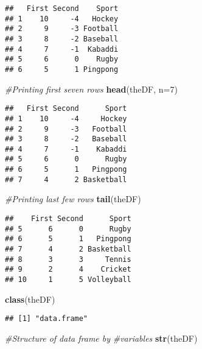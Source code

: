 \documentclass[
]{article}
\newenvironment{Shaded}{\begin{snugshade}}{\end{snugshade}}
\newcommand{\AttributeTok}[1]{\textcolor[rgb]{0.13,0.29,0.53}{#1}}
\newcommand{\CommentTok}[1]{\textcolor[rgb]{0.56,0.35,0.01}{\textit{#1}}}
\newcommand{\DecValTok}[1]{\textcolor[rgb]{0.00,0.00,0.81}{#1}}
\newcommand{\FunctionTok}[1]{\textcolor[rgb]{0.13,0.29,0.53}{\textbf{#1}}}
\newcommand{\NormalTok}[1]{#1}
\begin{document}
\begin{verbatim}
##   First Second    Sport
## 1    10     -4   Hockey
## 2     9     -3 Football
## 3     8     -2 Baseball
## 4     7     -1  Kabaddi
## 5     6      0    Rugby
## 6     5      1 Pingpong
\end{verbatim}

\begin{Shaded}
\begin{Highlighting}[]
\CommentTok{\#Printing first seven rows}
\FunctionTok{head}\NormalTok{(theDF, }\AttributeTok{n=}\DecValTok{7}\NormalTok{)}
\end{Highlighting}
\end{Shaded}

\begin{verbatim}
##   First Second      Sport
## 1    10     -4     Hockey
## 2     9     -3   Football
## 3     8     -2   Baseball
## 4     7     -1    Kabaddi
## 5     6      0      Rugby
## 6     5      1   Pingpong
## 7     4      2 Basketball
\end{verbatim}

\begin{Shaded}
\begin{Highlighting}[]
\CommentTok{\#Printing last few rows}
\FunctionTok{tail}\NormalTok{(theDF)}
\end{Highlighting}
\end{Shaded}

\begin{verbatim}
##    First Second      Sport
## 5      6      0      Rugby
## 6      5      1   Pingpong
## 7      4      2 Basketball
## 8      3      3     Tennis
## 9      2      4    Cricket
## 10     1      5 Volleyball
\end{verbatim}

\begin{Shaded}
\begin{Highlighting}[]
\FunctionTok{class}\NormalTok{(theDF)}
\end{Highlighting}
\end{Shaded}

\begin{verbatim}
## [1] "data.frame"
\end{verbatim}

\begin{Shaded}
\begin{Highlighting}[]
\CommentTok{\#Structure of data frame by}
\CommentTok{\#variables}
\FunctionTok{str}\NormalTok{(theDF)}
\end{Highlighting}
\end{Shaded}
\end{document}
